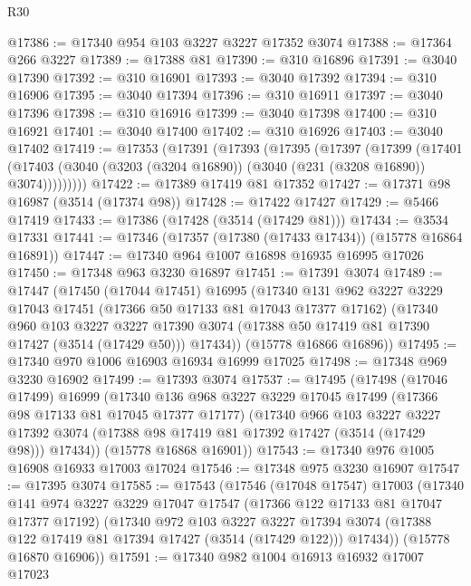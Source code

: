\begin{lexlean}{R30}
\begin{coremodule}
@17386 := @17340 @954 @103 @3227 @3227 @17352 @3074
@17388 := @17364 @266 @3227
@17389 := @17388 @81
@17390 := @310 @16896
@17391 := @3040 @17390
@17392 := @310 @16901
@17393 := @3040 @17392
@17394 := @310 @16906
@17395 := @3040 @17394
@17396 := @310 @16911
@17397 := @3040 @17396
@17398 := @310 @16916
@17399 := @3040 @17398
@17400 := @310 @16921
@17401 := @3040 @17400
@17402 := @310 @16926
@17403 := @3040 @17402
@17419 := @17353
    (@17391
      (@17393
        (@17395
          (@17397
            (@17399
              (@17401
                (@17403 (@3040 (@3203 (@3204 @16890)) (@3040 (@231 (@3208 @16890)) @3074)))))))))
@17422 := @17389 @17419 @81 @17352
@17427 := @17371 @98 @16987 (@3514 (@17374 @98))
@17428 := @17422 @17427
@17429 := @5466 @17419
@17433 := @17386 (@17428 (@3514 (@17429 @81)))
@17434 := @3534 @17331
@17441 := @17346 (@17357 (@17380 (@17433 @17434)) (@15778 @16864 @16891))
@17447 := @17340 @964 @1007 @16898 @16935 @16995 @17026
@17450 := @17348 @963 @3230 @16897
@17451 := @17391 @3074
@17489 := @17447
    (@17450
      (@17044 @17451)
      @16995
      (@17340
        @131
        @962
        @3227
        @3229
        @17043
        @17451
        (@17366 @50 @17133 @81 @17043 @17377 @17162)
        (@17340
          @960
          @103
          @3227
          @3227
          @17390
          @3074
          (@17388 @50 @17419 @81 @17390 @17427 (@3514 (@17429 @50)))
          @17434))
      (@15778 @16866 @16896))
@17495 := @17340 @970 @1006 @16903 @16934 @16999 @17025
@17498 := @17348 @969 @3230 @16902
@17499 := @17393 @3074
@17537 := @17495
    (@17498
      (@17046 @17499)
      @16999
      (@17340
        @136
        @968
        @3227
        @3229
        @17045
        @17499
        (@17366 @98 @17133 @81 @17045 @17377 @17177)
        (@17340
          @966
          @103
          @3227
          @3227
          @17392
          @3074
          (@17388 @98 @17419 @81 @17392 @17427 (@3514 (@17429 @98)))
          @17434))
      (@15778 @16868 @16901))
@17543 := @17340 @976 @1005 @16908 @16933 @17003 @17024
@17546 := @17348 @975 @3230 @16907
@17547 := @17395 @3074
@17585 := @17543
    (@17546
      (@17048 @17547)
      @17003
      (@17340
        @141
        @974
        @3227
        @3229
        @17047
        @17547
        (@17366 @122 @17133 @81 @17047 @17377 @17192)
        (@17340
          @972
          @103
          @3227
          @3227
          @17394
          @3074
          (@17388 @122 @17419 @81 @17394 @17427 (@3514 (@17429 @122)))
          @17434))
      (@15778 @16870 @16906))
@17591 := @17340 @982 @1004 @16913 @16932 @17007 @17023

\end{coremodule}
\end{lexlean}
